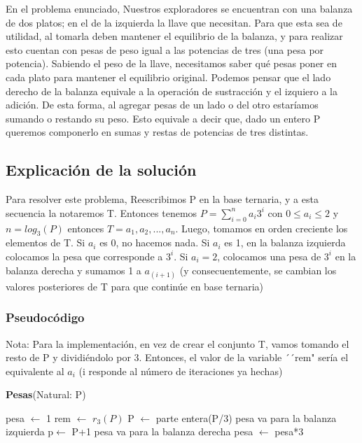 \documentclass[spanish,12pt]{article}
\begin{document}
En el problema enunciado, Nuestros exploradores se encuentran con una balanza de dos platos; en el de la izquierda la llave que necesitan. Para que esta sea de utilidad, al tomarla deben mantener el equilibrio de la balanza, y para realizar esto cuentan con pesas de peso igual a las potencias de tres (una pesa por potencia).
Sabiendo el peso de la llave, necesitamos saber qué pesas poner en cada plato para mantener el equilibrio original.
Podemos pensar que el lado derecho de la balanza equivale a la operación de sustracción y el izquiero a la adición. De esta forma, al agregar pesas de un lado o del otro estaríamos sumando o restando su peso.
Esto equivale a decir que, dado un entero P queremos componerlo en sumas y restas de potencias de tres distintas.

\subsection{Explicación de la solución}

Para resolver este problema, Reescribimos P en la base ternaria, y a esta secuencia la notaremos T. Entonces tenemos $P = \sum_{i=0}^{n} a_i3^i$  con $0 \leq a_i \leq 2$ y $n = log_{3}{(P)}$  entonces $T ={a_1,a_2,...,a_n}$.
Luego, tomamos en orden creciente los elementos de T. Si $a_i$ es 0, no hacemos nada. Si $a_i$ es 1, en la balanza izquierda colocamos la pesa que corresponde a $3^i$. Si $a_i =2$, colocamos una pesa de $3^i$ en la balanza derecha y sumamos 1 a $a_{(i+1)}$ (y consecuentemente, se cambian los valores posteriores de T para que continúe en base ternaria)


\subsubsection{Pseudocódigo}

Nota: Para la implementación, en vez de crear el conjunto T, vamos tomando el resto de P y dividiéndolo por 3. Entonces, el valor de la variable ´´rem" sería el equivalente al $a_i$ (i responde al número de iteraciones ya hechas)

\begin{algorithm}[H]{\textbf{Pesas}(Natural: P)}
	\begin{algorithmic}[1]
		\State pesa $\gets$ 1
		 	\State rem $\gets$ $r_3 (P)$
	    		\State P $\gets $ parte entera(P/3)
	    			\State pesa va para la balanza izquierda    			\Else
	    				\State p$\gets$ P+1
	    				\State pesa va para la balanza derecha
				\EndIf
			\EndIf
			\State pesa $\gets$ pesa*3
		\EndWhile
	\end{algorithmic}
\end{algorithm}
\end{document}

